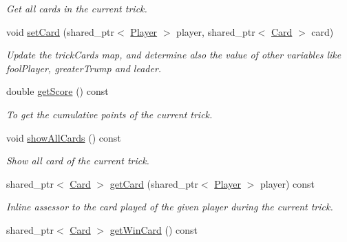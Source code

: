 \begin{DoxyCompactItemize}
\begin{DoxyCompactList}\small\item\em \-Get all cards in the current trick. \end{DoxyCompactList}\item 
void \hyperlink{classTrick_a4d2b4c09c8d7c255ff34bde5fe29532a}{set\-Card} (shared\-\_\-ptr$<$ \hyperlink{classPlayer}{\-Player} $>$ player, shared\-\_\-ptr$<$ \hyperlink{classCard}{\-Card} $>$ card)
\begin{DoxyCompactList}\small\item\em \-Update the trick\-Cards map, and determine also the value of other variables like fool\-Player, greater\-Trump and leader. \end{DoxyCompactList}\item 
\hypertarget{classTrick_a63625303ef93e30fec915b8cd039e6af}{double \hyperlink{classTrick_a63625303ef93e30fec915b8cd039e6af}{get\-Score} () const }\label{classTrick_a63625303ef93e30fec915b8cd039e6af}

\begin{DoxyCompactList}\small\item\em \-To get the cumulative points of the current trick. \end{DoxyCompactList}\item 
\hypertarget{classTrick_af156d49d692f5168320ebc30aa084da1}{void \hyperlink{classTrick_af156d49d692f5168320ebc30aa084da1}{show\-All\-Cards} () const }\label{classTrick_af156d49d692f5168320ebc30aa084da1}

\begin{DoxyCompactList}\small\item\em \-Show all card of the current trick. \end{DoxyCompactList}\item 
\hypertarget{classTrick_a1649b27628cb224f3eb98f56ea00f5ac}{shared\-\_\-ptr$<$ \hyperlink{classCard}{\-Card} $>$ \hyperlink{classTrick_a1649b27628cb224f3eb98f56ea00f5ac}{get\-Card} (shared\-\_\-ptr$<$ \hyperlink{classPlayer}{\-Player} $>$ player) const }\label{classTrick_a1649b27628cb224f3eb98f56ea00f5ac}

\begin{DoxyCompactList}\small\item\em \-Inline assessor to the card played of the given player during the current trick. \end{DoxyCompactList}\item 
\hypertarget{classTrick_ae5e65fbe08d6df0ca71224e465424c6b}{shared\-\_\-ptr$<$ \hyperlink{classCard}{\-Card} $>$ \hyperlink{classTrick_ae5e65fbe08d6df0ca71224e465424c6b}{get\-Win\-Card} () const }\label{classTrick_ae5e65fbe08d6df0ca71224e465424c6b}


\end{DoxyCompactItemize}
